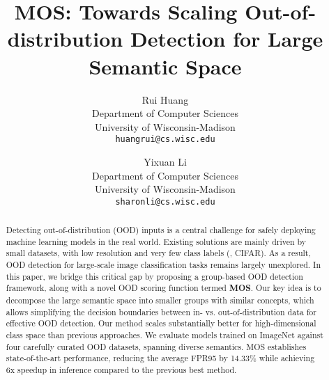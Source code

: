 \documentclass[final]{cvpr}
\begin{document}
\title{MOS: Towards Scaling Out-of-distribution Detection for Large Semantic Space}

\author{Rui Huang\\
Department of Computer Sciences\\
University of Wisconsin-Madison\\
{\tt\small huangrui@cs.wisc.edu}
\and
Yixuan Li\\
Department of Computer Sciences\\
University of Wisconsin-Madison\\
{\tt\small sharonli@cs.wisc.edu}
}
\maketitle

\begin{abstract}
\vspace{-0.2cm}
Detecting out-of-distribution (OOD) inputs is a central challenge for safely deploying machine learning models in the real world. 
Existing solutions are mainly driven by small datasets, with low resolution and very few class labels (\eg, CIFAR). As a result, OOD detection for large-scale image classification tasks remains largely unexplored. In this paper, we bridge this critical gap by proposing a group-based OOD detection framework, along with a novel OOD scoring function termed \textbf{MOS}. Our key idea is to decompose the large semantic space into smaller groups with similar concepts,  which allows simplifying the decision boundaries between in- vs. out-of-distribution data for effective OOD detection. Our method scales substantially better for high-dimensional class space than previous approaches. We evaluate models trained on ImageNet against four carefully curated OOD datasets, spanning diverse semantics. MOS  establishes state-of-the-art performance, reducing the average FPR95 by 14.33\% while achieving {6x} speedup in inference compared to the previous best method.



 



\end{abstract}
\end{document}
